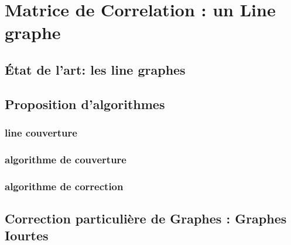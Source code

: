 \chapter{Matrice de Correlation : un Line graphe}
	\section{ \'Etat de l'art: les line graphes}
%		
		
	\section{Proposition d'algorithmes}
		\subsection{line couverture}
			
		\subsection{algorithme de couverture}
		\subsection{algorithme de correction}
			
	
	\section{Correction particuli\`ere de Graphes : Graphes Iourtes }
%		
	